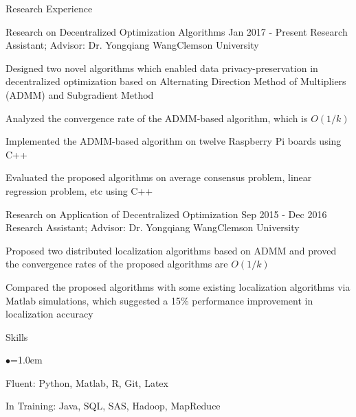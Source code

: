 \documentclass{resume} %
\begin{document}

\begin{rSection}{Research Experience}	
\begin{rSubsection}{Research on Decentralized Optimization Algorithms }
{Jan 2017 - Present }{Research Assistant; Advisor: Dr. Yongqiang Wang}{Clemson University}

 \setlength{\parindent}{2em}
 \item Designed two novel algorithms which enabled data privacy-preservation in decentralized optimization based on Alternating Direction Method of Multipliers (ADMM) and Subgradient Method
\item Analyzed the convergence rate of the ADMM-based algorithm, which is $O(1/k)$
\item Implemented the ADMM-based algorithm on twelve Raspberry Pi boards using C++
\item Evaluated the proposed algorithms on average consensus problem, linear regression problem, etc using C++
\end{rSubsection}	
		

\begin{rSubsection}{Research on Application of Decentralized Optimization}{ Sep 2015 - Dec 2016  }{Research Assistant; Advisor: Dr. Yongqiang Wang}{Clemson University}
       \item Proposed two distributed localization algorithms based on ADMM and proved the convergence rates of the proposed algorithms are $O(1/k)$
		\item Compared the proposed algorithms with some existing localization algorithms via Matlab simulations, which suggested a 15\% performance improvement in localization accuracy 
\end{rSubsection}
\end{rSection}


\vspace{-0.15cm}
\begin{rSection}{Skills}
  \begin{list}{$\bullet$}{\leftmargin=1.0em}
  	\item Fluent: Python, Matlab, R, Git, Latex 
  	\item In Training: Java, SQL, SAS, Hadoop, MapReduce 
  	\end{list}
\end{rSection}
\end{document}
